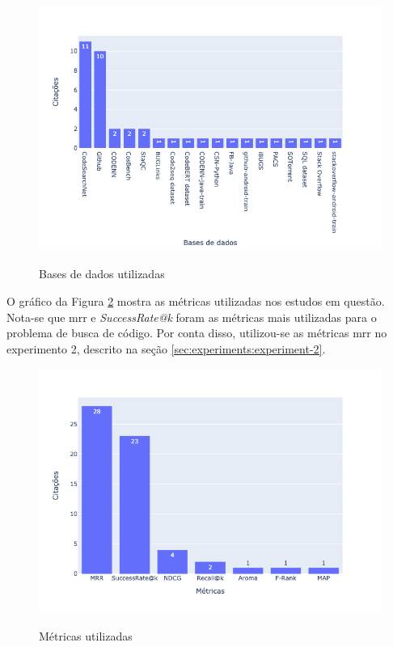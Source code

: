 \begin{figure}[H]
    \centering
    \caption{Bases de dados utilizadas}
    \includegraphics[width=1.0\columnwidth, height=0.6\columnwidth]{./imagens/trabalhos-relacionados/databases.png}
    \label{fig:related-datasets}
\end{figure}

O gráfico da Figura \ref{fig:related-metrics} mostra as métricas utilizadas nos estudos em questão. Nota-se que \gls{mrr} e \textit{SuccessRate@k} foram as métricas mais utilizadas para o problema de busca de código. Por conta disso, utilizou-se as métricas \gls{mrr} no experimento 2, descrito na seção \ref{sec:experiments:experiment-2}.
\begin{figure}[H]
    \centering
        \caption{Métricas utilizadas}
        \includegraphics[scale=0.5]{./imagens/trabalhos-relacionados/ir_metrics.png}
        \label{fig:related-metrics}
\end{figure}

